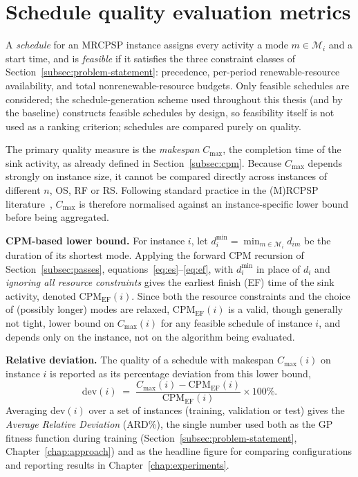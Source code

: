 \section{Schedule quality evaluation metrics}
\label{sec:eval-metrics}

A \emph{schedule} for an MRCPSP instance assigns every activity a mode
$m \in \mathcal{M}_i$ and a start time, and is \emph{feasible} if it satisfies the
three constraint classes of Section~\ref{subsec:problem-statement}:
precedence, per-period renewable-resource availability, and total
nonrenewable-resource budgets. Only feasible schedules are considered; the
schedule-generation scheme used throughout this thesis (and by the baseline)
constructs feasible schedules by design, so feasibility itself is not used as
a ranking criterion; schedules are compared purely on quality.

The primary quality measure is the \emph{makespan} $C_{\max}$, the completion
time of the sink activity, as already defined in
Section~\ref{subsec:cpm}. Because $C_{\max}$ depends strongly on instance
size, it cannot be compared directly across instances of different $n$, OS,
RF or RS. Following standard practice in the (M)RCPSP
literature~\cite{kolisch1997,vanpeteghem2014}, $C_{\max}$ is therefore
normalised against an instance-specific lower bound before being aggregated.

\textbf{CPM-based lower bound.} For instance $i$, let
$d_{i}^{\min} = \min_{m \in \mathcal{M}_i} d_{im}$ be the duration of its shortest
mode. Applying the forward CPM recursion of
Section~\ref{subsec:passes}, equations~\eqref{eq:es}--\eqref{eq:ef}, with
$d_{i}^{\min}$ in place of $d_i$ and \emph{ignoring all resource
constraints} gives the earliest finish (EF) time of the sink activity, denoted
$\mathrm{CPM}_{\mathrm{EF}}(i)$. Since both the resource constraints and the
choice of (possibly longer) modes are relaxed, $\mathrm{CPM}_{\mathrm{EF}}(i)$
is a valid, though generally not tight, lower bound on $C_{\max}(i)$ for
any feasible schedule of instance $i$, and depends only on the instance, not
on the algorithm being evaluated.

\textbf{Relative deviation.} The quality of a schedule with makespan
$C_{\max}(i)$ on instance $i$ is reported as its percentage deviation from
this lower bound,
\[
  \mathrm{dev}(i) \;=\; \frac{C_{\max}(i) - \mathrm{CPM}_{\mathrm{EF}}(i)}{\mathrm{CPM}_{\mathrm{EF}}(i)} \times 100\%.
\]
Averaging $\mathrm{dev}(i)$ over a set of instances (training, validation or
test) gives the \emph{Average Relative Deviation} (ARD\%), the single number
used both as the GP fitness function during training
(Section~\ref{subsec:problem-statement}, Chapter~\ref{chap:approach}) and as
the headline figure for comparing configurations and reporting results in
Chapter~\ref{chap:experiments}.

